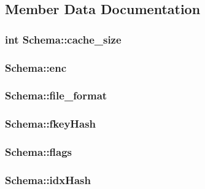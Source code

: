 \subsection{Member Data Documentation}
\hypertarget{struct_schema_a0a66691be95a30c099ca4840da7110dd}{
\subsubsection[{cache\-\_\-size}]{\setlength{\rightskip}{0pt plus 5cm}int Schema\-::cache\-\_\-size}}\label{struct_schema_a0a66691be95a30c099ca4840da7110dd}
\hypertarget{struct_schema_a1338d09fe9cbb5a8162929202cb73cae}{
\subsubsection[{enc}]{ Schema\-::enc}}\label{struct_schema_a1338d09fe9cbb5a8162929202cb73cae}
\hypertarget{struct_schema_ab9f0371436e41b3080772995407a4cca}{
\subsubsection[{file\-\_\-format}]{ Schema\-::file\-\_\-format}}\label{struct_schema_ab9f0371436e41b3080772995407a4cca}
\hypertarget{struct_schema_ad51ed96351701cfe8d9e871722827c11}{
\subsubsection[{fkey\-Hash}]{ Schema\-::fkey\-Hash}}\label{struct_schema_ad51ed96351701cfe8d9e871722827c11}
\hypertarget{struct_schema_a14838766a0a438e590a27f300beff459}{
\subsubsection[{flags}]{ Schema\-::flags}}\label{struct_schema_a14838766a0a438e590a27f300beff459}
\hypertarget{struct_schema_ac0dd242f486d17ddadca1e47af76c6c5}{
\subsubsection[{idx\-Hash}]{ Schema\-::idx\-Hash}}\label{struct_schema_ac0dd242f486d17ddadca1e47af76c6c5}
